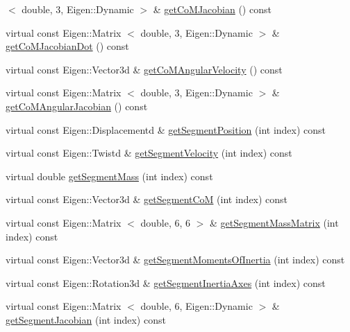 \begin{DoxyCompactItemize}
$<$ double, 3, \-Eigen\-::\-Dynamic $>$ \& \hyperlink{classocra__icub_1_1OcraWbiModel_abc79b9dec9e96e4e8125d26c6be479d6}{get\-Co\-M\-Jacobian} () const 
\item 
virtual const \-Eigen\-::\-Matrix\*
$<$ double, 3, \-Eigen\-::\-Dynamic $>$ \& \hyperlink{classocra__icub_1_1OcraWbiModel_acc2992d42ea92d55e172622c83ec1bdc}{get\-Co\-M\-Jacobian\-Dot} () const 
\item 
virtual const \-Eigen\-::\-Vector3d \& \hyperlink{classocra__icub_1_1OcraWbiModel_a98c163c5f051c36b78ff24810421664c}{get\-Co\-M\-Angular\-Velocity} () const 
\item 
virtual const \-Eigen\-::\-Matrix\*
$<$ double, 3, \-Eigen\-::\-Dynamic $>$ \& \hyperlink{classocra__icub_1_1OcraWbiModel_aede9be679109798e7342351d13ffdfcd}{get\-Co\-M\-Angular\-Jacobian} () const 
\item 
virtual const \*
\-Eigen\-::\-Displacementd \& \hyperlink{classocra__icub_1_1OcraWbiModel_ad6b33c312d04c4bba05e0df67d8bae06}{get\-Segment\-Position} (int index) const 
\item 
virtual const \-Eigen\-::\-Twistd \& \hyperlink{classocra__icub_1_1OcraWbiModel_a273d90e5ad6d3c1e849b996b1cfc1860}{get\-Segment\-Velocity} (int index) const 
\item 
virtual double \hyperlink{classocra__icub_1_1OcraWbiModel_a2d04857d60138f1664b7828e0d3a307d}{get\-Segment\-Mass} (int index) const 
\item 
virtual const \-Eigen\-::\-Vector3d \& \hyperlink{classocra__icub_1_1OcraWbiModel_a2e2dc6611ff436dcd09ba979197e712d}{get\-Segment\-Co\-M} (int index) const 
\item 
virtual const \-Eigen\-::\-Matrix\*
$<$ double, 6, 6 $>$ \& \hyperlink{classocra__icub_1_1OcraWbiModel_af5849bc569b86523cf515a031b5e14a7}{get\-Segment\-Mass\-Matrix} (int index) const 
\item 
virtual const \-Eigen\-::\-Vector3d \& \hyperlink{classocra__icub_1_1OcraWbiModel_a383b0fc03ffb220899aba6b25fcb6272}{get\-Segment\-Moments\-Of\-Inertia} (int index) const 
\item 
virtual const \-Eigen\-::\-Rotation3d \& \hyperlink{classocra__icub_1_1OcraWbiModel_ad9f9d9013433b1bbf5a59914bee38b14}{get\-Segment\-Inertia\-Axes} (int index) const 
\item 
virtual const \-Eigen\-::\-Matrix\*
$<$ double, 6, \-Eigen\-::\-Dynamic $>$ \& \hyperlink{classocra__icub_1_1OcraWbiModel_a5f0aa99b6b6e85b465ad3a5238caeb9d}{get\-Segment\-Jacobian} (int index) const 
\item 

\end{DoxyCompactItemize}

